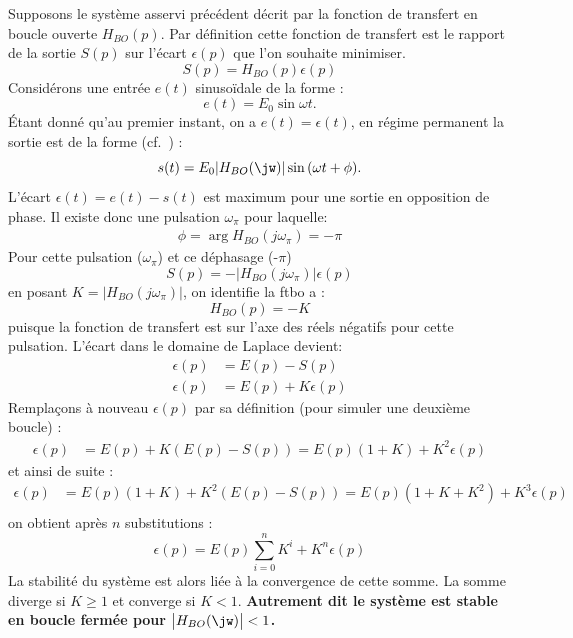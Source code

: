 Supposons le système asservi précédent décrit par la fonction de transfert 
en boucle ouverte $H_{BO}(p)$. Par définition cette fonction de transfert 
est le rapport de la sortie $S(p)$ sur l'écart $\epsilon(p)$ que l'on 
souhaite minimiser.
\[
    S(p)=H_{BO}(p)\epsilon(p)
\]
Considérons une entrée $e(t)$ sinuso\"idale de la forme :
\[
    e(t)=E_0\sin{\omega t}.
\]
\'Etant donné qu'au premier instant, on a $e(t)=\epsilon(t)$,
en régime permanent la sortie est de la forme (cf.~) :
\[
    s(t)=E_0|H_{BO}(\jw)|\sin{(\omega t+\phi)}.
\]
L'écart $\epsilon(t)=e(t)-s(t)$ est maximum pour une sortie en opposition 
de phase. Il existe donc une pulsation $\omega_\pi$ pour laquelle:
\begin{align*}
    \phi=\arg{H_{BO}(j\omega_\pi)}=-\pi
\end{align*}
Pour cette pulsation ($\omega_\pi$) et ce déphasage (-$\pi$)
\[
    S(p)=-\big|H_{BO}(j\omega_\pi)\big|\epsilon(p)
\]
en posant $K=|H_{BO}(j\omega_\pi)|$, on identifie la \gls{ftbo} a :
\[
    H_{BO}(p)=-K
\]
puisque la fonction de transfert est sur l'axe des réels négatifs pour 
cette pulsation.
L'écart dans le domaine de Laplace devient:
\begin{align*}
    \epsilon(p)&=E(p)-S(p)\\
    \epsilon(p)&=E(p)+K\epsilon(p)
\end{align*}
Remplaçons à nouveau $\epsilon(p)$ par sa définition (pour simuler une 
deuxième boucle) : 
\begin{align*}
    \epsilon(p)&=E(p)+K(E(p)-S(p))=E(p)(1+K)+K^2\epsilon(p)
\end{align*}
et ainsi de suite :
\begin{align*}
    \epsilon(p)&=E(p)(1+K)+K^2\left(E(p)-S(p)\right)
                =E(p)(1+K+K^2)+K^3\epsilon(p)\\
\end{align*}
on obtient après $n$ substitutions :
\[
\epsilon(p)=E(p)\sum_{i=0}^{n}K^i+K^n\epsilon(p)
\]
La stabilité du système est alors liée à la convergence de cette somme.
La somme diverge si $K\geq1$ et converge si $K<1$. 
\textbf{Autrement dit le système est stable en boucle fermée 
pour $\big|H_{BO}(\jw)\big|<1$.}

